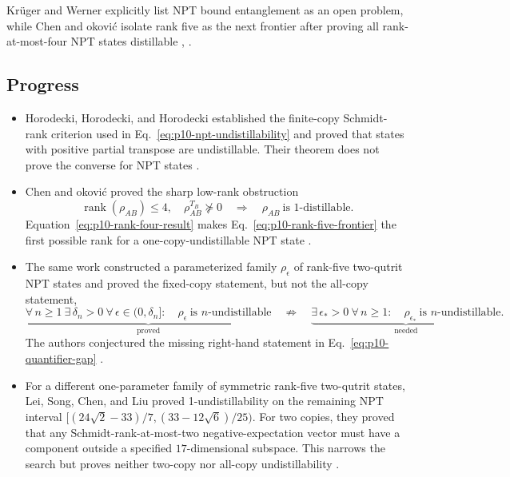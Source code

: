 Kr\"uger and Werner explicitly list NPT bound entanglement as an open
problem, while Chen and \DJ okovi\'c isolate rank five as the next
frontier after proving all rank-at-most-four NPT states distillable
,
.

\subsection*{Progress}

\begin{itemize}
  \item Horodecki, Horodecki, and Horodecki established the finite-copy
  Schmidt-rank criterion used in
  Eq.~\eqref{eq:p10-npt-undistillability} and proved that states with positive
  partial transpose are undistillable.  Their theorem does not prove the
  converse for NPT states
  .

  \item Chen and \DJ okovi\'c proved the sharp low-rank obstruction
  \begin{equation}
    \operatorname{rank}(\rho_{AB})\leq4,
    \quad \rho_{AB}^{T_B}\not\succeq0
    \quad\Longrightarrow\quad
    \rho_{AB}\ \text{is 1-distillable}.
    \label{eq:p10-rank-four-result}
  \end{equation}
  Equation~\eqref{eq:p10-rank-four-result} makes
  Eq.~\eqref{eq:p10-rank-five-frontier} the first possible rank for a
  one-copy-undistillable NPT state
  .

  \item The same work constructed a parameterized family $\rho_\epsilon$ of
  rank-five two-qutrit NPT states and proved the fixed-copy statement, but not
  the all-copy statement,
  \begin{equation}
    \underbrace{\forall\,n\geq1\ \exists\,\delta_n>0\ 
      \forall\,\epsilon\in(0,\delta_n]:\quad
      \rho_\epsilon\ \text{is $n$-undistillable}}_{\text{proved}}
    \quad\not\Longrightarrow\quad
    \underbrace{\exists\,\epsilon_*>0\ \forall\,n\geq1:\quad
      \rho_{\epsilon_*}\ \text{is $n$-undistillable}}_{\text{needed}}.
    \label{eq:p10-quantifier-gap}
  \end{equation}
  The authors conjectured the missing right-hand statement in
  Eq.~\eqref{eq:p10-quantifier-gap}
  .

  \item For a different one-parameter family of symmetric rank-five
  two-qutrit states, Lei, Song, Chen, and Liu proved 1-undistillability on the
  remaining NPT interval
  $[(24\sqrt{2}-33)/7,(33-12\sqrt{6})/25)$.  For two copies, they proved that
  any Schmidt-rank-at-most-two negative-expectation vector must have a
  component outside a specified $17$-dimensional subspace.  This narrows the
  search but proves neither two-copy nor all-copy undistillability
  \sourcecite{ref:p10-lei-et-al}{LSC+26}.


\end{itemize}
